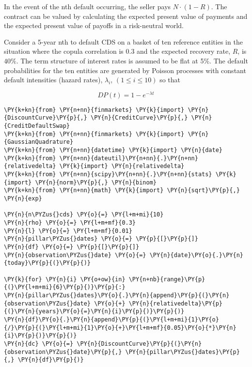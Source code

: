 In the event of the nth default occurring, the seller pays
\(N\cdot(1-R)\). The contract can be valued by calculating the expected
present value of payments and the expected present value of payoffs in a
risk-neutral world.

Consider a 5-year nth to default CDS on a basket of ten
reference entities in the situation where the copula correlation is 0.3
and the expected recovery rate, \(R\), is \(40\%\). The term structure
of interest rates is assumed to be flat at 5\%. The default
probabilities for the ten entities are generated by Poisson processes
with constant default intensities (hazard rates), \(\lambda_i\),
\((1 \le i \le 10)\) so that

\[ DP(t) = 1 - e^{-\lambda t} \]

\begin{tcolorbox}[breakable, size=fbox, boxrule=1pt, pad at break*=1mm,colback=cellbackground, colframe=cellborder]
\begin{Verbatim}[commandchars=\\\{\}]
\PY{k+kn}{from} \PY{n+nn}{finmarkets} \PY{k}{import} \PY{n}{DiscountCurve}\PY{p}{,} \PY{n}{CreditCurve}\PY{p}{,} \PY{n}{CreditDefaultSwap}
\PY{k+kn}{from} \PY{n+nn}{finmarkets} \PY{k}{import} \PY{n}{GaussianQuadrature}
\PY{k+kn}{from} \PY{n+nn}{datetime} \PY{k}{import} \PY{n}{date}
\PY{k+kn}{from} \PY{n+nn}{dateutil}\PY{n+nn}{.}\PY{n+nn}{relativedelta} \PY{k}{import} \PY{n}{relativedelta}
\PY{k+kn}{from} \PY{n+nn}{scipy}\PY{n+nn}{.}\PY{n+nn}{stats} \PY{k}{import} \PY{n}{norm}\PY{p}{,} \PY{n}{binom}
\PY{k+kn}{from} \PY{n+nn}{math} \PY{k}{import} \PY{n}{sqrt}\PY{p}{,} \PY{n}{exp}
	
\PY{n}{n\PYZus{}cds} \PY{o}{=} \PY{l+m+mi}{10}
\PY{n}{rho} \PY{o}{=} \PY{l+m+mf}{0.3}
\PY{n}{l} \PY{o}{=} \PY{l+m+mf}{0.01}
\PY{n}{pillar\PYZus{}dates} \PY{o}{=} \PY{p}{[}\PY{p}{]}
\PY{n}{df} \PY{o}{=} \PY{p}{[}\PY{p}{]}
\PY{n}{observation\PYZus{}date} \PY{o}{=} \PY{n}{date}\PY{o}{.}\PY{n}{today}\PY{p}{(}\PY{p}{)}
	
\PY{k}{for} \PY{n}{i} \PY{o+ow}{in} \PY{n+nb}{range}\PY{p}{(}\PY{l+m+mi}{6}\PY{p}{)}\PY{p}{:}
\PY{n}{pillar\PYZus{}dates}\PY{o}{.}\PY{n}{append}\PY{p}{(}\PY{n}{observation\PYZus{}date} \PY{o}{+} \PY{n}{relativedelta}\PY{p}{(}\PY{n}{years}\PY{o}{=}\PY{n}{i}\PY{p}{)}\PY{p}{)}
\PY{n}{df}\PY{o}{.}\PY{n}{append}\PY{p}{(}\PY{l+m+mi}{1}\PY{o}{/}\PY{p}{(}\PY{l+m+mi}{1}\PY{o}{+}\PY{l+m+mf}{0.05}\PY{o}{*}\PY{n}{i}\PY{p}{)}\PY{p}{)}
\PY{n}{dc} \PY{o}{=} \PY{n}{DiscountCurve}\PY{p}{(}\PY{n}{observation\PYZus{}date}\PY{p}{,} \PY{n}{pillar\PYZus{}dates}\PY{p}{,} \PY{n}{df}\PY{p}{)}
	

\end{Verbatim}
\end{tcolorbox}
